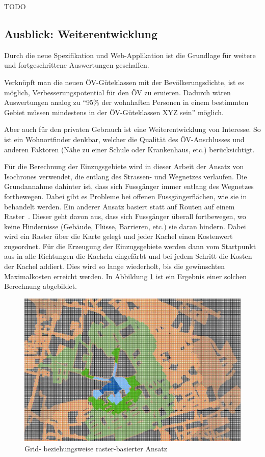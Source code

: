 TODO

\subsection{Ausblick: Weiterentwicklung}
\label{Resultate:Ausblick: Weiterentwicklung}

Durch die neue Spezifikation und Web-Applikation ist die Grundlage für weitere und fortgeschrittene Auswertungen geschaffen.

Verknüpft man die neuen \acs{ÖV}-Güteklassen mit der Bevölkerungsdichte, ist es möglich, Verbesserungspotential für den \acs{ÖV} zu eruieren.
Dadurch wären Auswertungen analog zu "`95\% der wohnhaften Personen in einem bestimmten Gebiet müssen mindestens in der \acs{ÖV}-Güteklassen XYZ sein"' möglich.

Aber auch für den privaten Gebrauch ist eine Weiterentwicklung von Interesse.
So ist ein Wohnortfinder denkbar, welcher die Qualität des \acs{ÖV}-Anschlusses und anderen Faktoren (Nähe zu einer Schule oder Krankenhaus, etc.) berücksichtigt.

Für die Berechnung der Einzugsgebiete wird in dieser Arbeit der Ansatz von \glspl{Isochrone} verwendet, die entlang des Strassen- und Wegnetzes verlaufen.
Die Grundannahme dahinter ist, dass sich Fussgänger immer entlang des Wegnetzes fortbewegen.
Dabei gibt es Probleme bei offenen Fussgängerflächen, wie sie in~\cite{plaza_route} behandelt werden.
Ein anderer Ansatz basiert statt auf Routen auf einem Raster~\cite{pedestrian_accessibility_planning}. Dieser geht davon aus, dass sich Fussgänger überall fortbewegen, wo keine Hindernisse (Gebäude, Flüsse, Barrieren, etc.) sie daran hindern.
Dabei wird ein Raster über die Karte gelegt und jeder Kachel einen Kostenwert zugeordnet.
Für die Erzeugung der Einzugsgebiete werden dann vom Startpunkt aus in alle Richtungen die Kacheln eingefärbt und bei jedem Schritt die Kosten der Kachel addiert.
Dies wird so lange wiederholt, bis die gewünschten Maximalkosten erreicht werden.
In Abbildung \ref{fig:grid_based_approach} ist ein Ergebnis einer solchen Berechnung abgebildet.

\begin{figure}[ht]
    \centering
    \includegraphics[width=0.6\linewidth]{start/img/grid_based_approach.png}
    \caption[Grid- beziehungsweise raster-basierter Ansatz]{Grid- beziehungsweise raster-basierter Ansatz~\cite{pedestrian_accessibility_planning}}
    \label{fig:grid_based_approach}
\end{figure}


